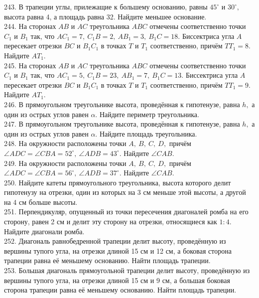 243. В трапеции углы, прилежащие к большему основанию, равны $45^\circ$ и $30^\circ,$ высота равна 4, а площадь равна 32. Найдите меньшее основание.\\
244. На сторонах $AB$ и $AC$ треугольника $ABC$ отмечены соответственно точки $C_1$ и $B_1$ так, что $AC_1=7,\
C_1B=2,\ AB_1=3,\ B_1C=18.$ Биссектриса угла $A$ пересекает отрезки $BC$ и $B_1C_1$ в точках $T$ и $T_1$ соответственно, причём
$TT_1=8.$ Найдите $AT_1.$\\
245. На сторонах $AB$ и $AC$ треугольника $ABC$ отмечены соответственно точки $C_1$ и $B_1$ так, что $AC_1=5,\
C_1B=23,\ AB_1=7,\ B_1C=13.$ Биссектриса угла $A$ пересекает отрезки $BC$ и $B_1C_1$ в точках $T$ и $T_1$ соответственно, причём
$TT_1=9.$ Найдите $AT_1.$\\
246. В прямоугольном треугольнике высота, проведённая к гипотенузе, равна $h,$ а один из острых
углов равен $\alpha.$ Найдите периметр треугольника.\\
247. В прямоугольном треугольнике высота, проведённая к гипотенузе, равна $h,$ а один из острых
углов равен $\alpha.$ Найдите площадь треугольника.\\
248. На окружности расположены точки $A,\ B,\ C,\ D,$ причём $\angle ADC=\angle CBA=52^\circ,\
\angle ADB=43^\circ.$ Найдите $\angle CAB.$\\
249. На окружности расположены точки $A,\ B,\ C,\ D,$ причём $\angle ADC=\angle CBA=56^\circ,\
\angle ADB=37^\circ.$ Найдите $\angle CAB.$\\
250. Найдите катеты прямоугольного треугольника, высота
которого делит гипотенузу на отрезки, один из которых
на 3 см меньше этой высоты, а другой на 4 см больше
высоты.\\
251. Перпендикуляр, опущенный из точки пересечения
диагоналей ромба на его сторону, равен 2 см и делит эту
сторону на отрезки, относящиеся как $1:4.$ Найдите
диагонали ромба.\\
252. Диагональ равнобедренной трапеции делит высоту,
проведённую из вершины тупого угла, на отрезки длиной
15 см и 12 см, а боковая сторона трапеции равна её
меньшему основанию. Найти площадь трапеции.\\
253. Большая диагональ прямоугольной трапеции делит
высоту, проведённую из вершины тупого угла, на отрезки
длиной 15 см и 9 см, а большая боковая сторона трапеции
равна её меньшему основанию. Найти площадь
трапеции.
\newpage
